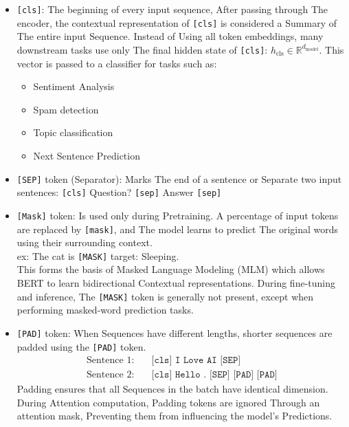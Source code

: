 \begin{itemize}
    \item \texttt{[cls]}: The beginning of every input sequence, After passing through The encoder, the contextual representation of \texttt{[cls]} is considered a Summary of The entire input Sequence. Instead of Using all token embeddings, many downstream tasks use only The final hidden state of \texttt{[cls]}: $h_{\text{cls}} \in \mathbb{R}^{d_{\text{model}}}$. This vector is passed to a classifier for tasks such as:
    \begin{itemize}
        \item Sentiment Analysis
        \item Spam detection
        \item Topic classification
        \item Next Sentence Prediction
    \end{itemize}
    
    \item \texttt{[SEP]} token (Separator): Marks The end of a sentence or Separate two input sentences: \texttt{[cls]} Question? \texttt{[sep]} Answer \texttt{[sep]}
    
    \item \texttt{[Mask]} token: Is used only during Pretraining. A percentage of input tokens are replaced by \texttt{[mask]}, and The model learns to predict The original words using their surrounding context. \\
    ex: The cat is \texttt{[MASK]} target: Sleeping. \\
    This forms the basis of Masked Language Modeling (MLM) which allows BERT to learn bidirectional Contextual representations. During fine-tuning and inference, The \texttt{[MASK]} token is generally not present, except when performing masked-word prediction tasks.
    
    \item \texttt{[PAD]} token: When Sequences have different lengths, shorter sequences are padded using the \texttt{[PAD]} token.
    \begin{align*}
    \text{Sentence 1}: &\quad \texttt{[cls] I Love AI [SEP]} \\
    \text{Sentence 2}: &\quad \texttt{[cls] Hello . [SEP] [PAD] [PAD]}
    \end{align*}
    Padding ensures that all Sequences in the batch have identical dimension. During Attention computation, Padding tokens are ignored Through an attention mask, Preventing them from influencing the model's Predictions.
\end{itemize}

